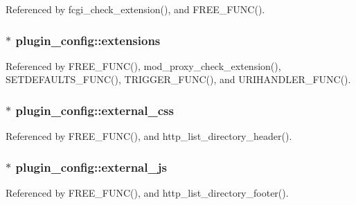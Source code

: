 Referenced by fcgi\-\_\-check\-\_\-extension(), and F\-R\-E\-E\-\_\-\-F\-U\-N\-C().

\hypertarget{structplugin__config_af4ff187480d6eb0b75b2d62d15ed94ee}{
\subsubsection[{extensions}]{ $\ast$ plugin\-\_\-config\-::extensions}}\label{structplugin__config_af4ff187480d6eb0b75b2d62d15ed94ee}


Referenced by F\-R\-E\-E\-\_\-\-F\-U\-N\-C(), mod\-\_\-proxy\-\_\-check\-\_\-extension(), S\-E\-T\-D\-E\-F\-A\-U\-L\-T\-S\-\_\-\-F\-U\-N\-C(), T\-R\-I\-G\-G\-E\-R\-\_\-\-F\-U\-N\-C(), and U\-R\-I\-H\-A\-N\-D\-L\-E\-R\-\_\-\-F\-U\-N\-C().

\hypertarget{structplugin__config_a0de3019ee9404f690458f15c08d8f790}{
\subsubsection[{external\-\_\-css}]{$\ast$ plugin\-\_\-config\-::external\-\_\-css}}\label{structplugin__config_a0de3019ee9404f690458f15c08d8f790}


Referenced by F\-R\-E\-E\-\_\-\-F\-U\-N\-C(), and http\-\_\-list\-\_\-directory\-\_\-header().

\hypertarget{structplugin__config_a1ebcf64863e68185ff0a19e199b9a6b5}{
\subsubsection[{external\-\_\-js}]{$\ast$ plugin\-\_\-config\-::external\-\_\-js}}\label{structplugin__config_a1ebcf64863e68185ff0a19e199b9a6b5}


Referenced by F\-R\-E\-E\-\_\-\-F\-U\-N\-C(), and http\-\_\-list\-\_\-directory\-\_\-footer().

